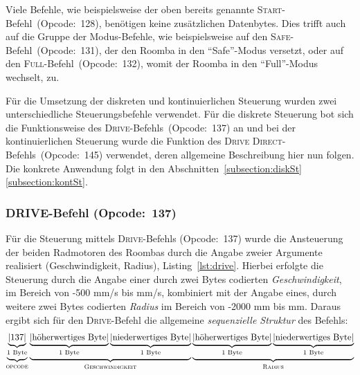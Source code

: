 Viele Befehle, wie beispielsweise der oben bereits genannte \textsc{Start}-Befehl~(Opcode:~128), benötigen keine zusätzlichen Datenbytes. Dies trifft auch auf die Gruppe der Modus-Befehle, wie beispielsweise auf den \textsc{Safe}-Befehl~(Opcode:~131), der den Roomba in den \enquote{Safe}-Modus versetzt, oder auf den \textsc{Full}-Befehl~(Opcode:~132), womit der Roomba in den \enquote{Full}-Modus wechselt, zu.

Für die Umsetzung der diskreten und kontinuierlichen Steuerung wurden zwei unterschiedliche Steuerungsbefehle verwendet. Für die diskrete Steuerung bot sich die Funk\-tions\-weise des \textsc{Drive}-Befehls~(Opcode:~137) an und bei der kontinuierlichen Steuerung wurde die Funktion des \textsc{Drive Direct}-Befehls~(Opcode:~145) verwendet, deren allgemeine Beschreibung hier nun folgen. Die konkrete Anwendung folgt in den Abschnitten~\ref{subsection:diskSt} \bzw \ref{subsection:kontSt}.

\subsubsection{\textsc{DRIVE}-Befehl (Opcode:~137)}
Für die Steuerung mittels \textsc{Drive}-Befehls (Opcode:~137) wurde die Ansteuerung der beiden Radmotoren des Roombas durch die Angabe zweier Argumente realisiert (Geschwindigkeit, Radius), \vgl Listing~\ref{lst:drive}.
Hierbei erfolgte die Steuerung durch die Angabe einer durch zwei Bytes codierten \textit{Geschwindigkeit}, im Bereich von -500 mm/s bis  mm/s, kombiniert mit der Angabe eines, durch weitere zwei Bytes codierten \textit{Radius} im Bereich von -2000 mm bis  mm. Daraus ergibt sich für den \textsc{Drive}-Befehl die allgemeine \textit{sequenzielle Struktur} des Befehls:
\begin{equation*}
\begin{split}
\underbrace{\underbrace{\text{|137|}}_{\substack{\text{\text{1 Byte}}}}}_{\substack{\text{\textsc{opcode}}}} \underbrace{\underbrace{\text{|höherwertiges Byte|}}_{\substack{\text{1 Byte}}} \underbrace{\text{|niederwertiges Byte|}}_{\substack{\text{1 Byte}}}}_{\substack{\text{\textsc{Geschwindigkeit}}}} \underbrace{\underbrace{\text{|höherwertiges Byte|}}_{\substack{\text{1 Byte}}} \underbrace{\text{|niederwertiges Byte|}}_{\substack{\text{1 Byte}}}}_{\substack{\text{\textsc{Radius}}}}
\end{split}
\end{equation*}

